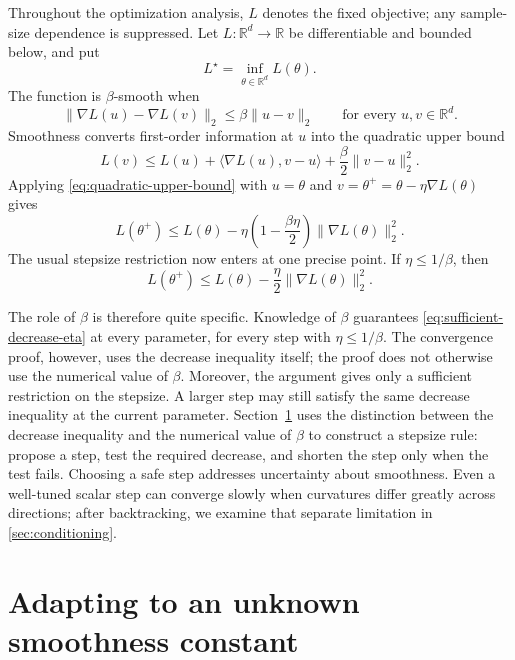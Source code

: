 \documentclass[11pt,twoside]{article}
\newcommand{\R}{\mathbb R}
\theoremstyle{definition}
\theoremstyle{remark}
\begin{document}
Throughout the optimization analysis, $L$ denotes the fixed objective;
any sample-size dependence is suppressed. Let $L:\R^d\to\R$ be
differentiable and bounded below, and put
\[
 L^\star=\inf_{\theta\in\R^d}L(\theta).
\]
The function is $\beta$-smooth when
\begin{equation}
 \|\nabla L(u)-\nabla L(v)\|_2
 \le\beta\|u-v\|_2
 \qquad\text{for every }u,v\in\R^d.
\label{eq:smoothness}
\end{equation}
Smoothness converts first-order information at $u$ into the quadratic upper
bound
\begin{equation}
 L(v)\le L(u)
 +\langle\nabla L(u),v-u\rangle
 +\frac\beta2\|v-u\|_2^2.
\label{eq:quadratic-upper-bound}
\end{equation}
Applying \cref{eq:quadratic-upper-bound} with
$u=\theta$ and $v=\theta^+=\theta-\eta\nabla L(\theta)$ gives
\begin{equation}
 L(\theta^+)
 \le L(\theta)-\eta\left(1-\frac{\beta\eta}{2}\right)
                  \|\nabla L(\theta)\|_2^2.
\label{eq:smooth-gradient-decrease}
\end{equation}
The usual stepsize restriction now enters at one precise point. If
$\eta\le1/\beta$, then
\begin{equation}
 L(\theta^+)\le L(\theta)-\frac\eta2\|\nabla L(\theta)\|_2^2.
\label{eq:sufficient-decrease-eta}
\end{equation}

The role of $\beta$ is therefore quite specific. Knowledge of $\beta$
guarantees \cref{eq:sufficient-decrease-eta} at every parameter, for every
step with $\eta\le1/\beta$. The convergence proof, however, uses the decrease
inequality itself; the proof does not otherwise use the numerical value of
$\beta$.
Moreover, the argument gives only a sufficient restriction on the stepsize.
A larger step may still satisfy the same decrease inequality at the current
parameter. Section~\ref{sec:backtracking} uses the distinction between the
decrease inequality and the numerical value of $\beta$ to construct a
stepsize rule: propose a step, test the required decrease, and shorten the
step only when the test fails. Choosing a safe step addresses uncertainty
about smoothness. Even a well-tuned scalar step can converge slowly when
curvatures differ greatly across directions; after backtracking, we examine
that separate limitation in \cref{sec:conditioning}.

\section{Adapting to an unknown smoothness constant}
\label{sec:backtracking}
\end{document}
